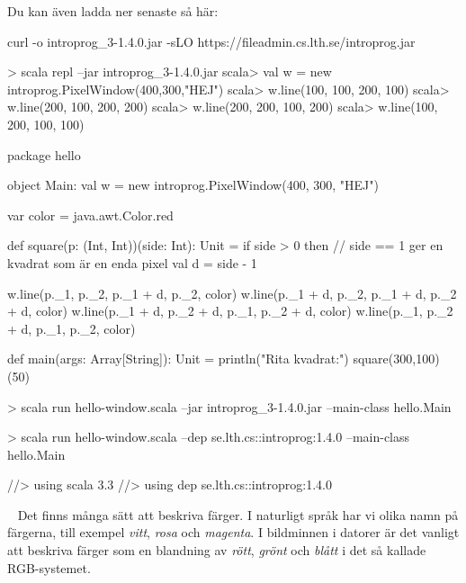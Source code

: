 \SubtaskSolved 
Du kan även ladda ner senaste  så här:
\begin{REPLnonum}
curl -o introprog_3-1.4.0.jar -sLO https://fileadmin.cs.lth.se/introprog.jar 
\end{REPLnonum}


\SubtaskSolved
\begin{REPL}
> scala repl --jar introprog_3-1.4.0.jar
scala> val w = new introprog.PixelWindow(400,300,"HEJ")
scala> w.line(100, 100, 200, 100)
scala> w.line(200, 100, 200, 200)
scala> w.line(200, 200, 100, 200)
scala> w.line(100, 200, 100, 100)
\end{REPL}

\SubtaskSolved
\begin{Code}
package hello

object Main:
  val w = new introprog.PixelWindow(400, 300, "HEJ")

  var color = java.awt.Color.red

  def square(p: (Int, Int))(side: Int): Unit =
    if side > 0 then
      // side == 1 ger en kvadrat som är en enda pixel
      val d = side - 1  
      
      w.line(p._1,     p._2,     p._1 + d, p._2,     color)
      w.line(p._1 + d, p._2,     p._1 + d, p._2 + d, color)
      w.line(p._1 + d, p._2 + d, p._1,     p._2 + d, color)
      w.line(p._1,     p._2 + d, p._1,     p._2,     color)

  def main(args: Array[String]): Unit =
    println("Rita kvadrat:")
    square(300,100)(50)

\end{Code}

\SubtaskSolved 
\begin{REPLnonum}
> scala run hello-window.scala --jar introprog_3-1.4.0.jar --main-class hello.Main
\end{REPLnonum}

\SubtaskSolved 
\begin{REPLnonum}
> scala run hello-window.scala --dep se.lth.cs::introprog:1.4.0 --main-class hello.Main
\end{REPLnonum}


\SubtaskSolved 
\begin{Code}
//> using scala 3.3
//> using dep se.lth.cs::introprog:1.4.0
\end{Code}
\QUESTEND




\QUESTBEGIN

\Task \what~ Det finns många sätt att beskriva färger.
I naturligt språk har vi olika namn på färgerna, till exempel \emph{vitt}, \emph{rosa} och \emph{magenta}.
I bildminnen i datorer är det vanligt att beskriva färger som en blandning av \emph{rött}, \emph{grönt} och \emph{blått} i det så kallade RGB-systemet.


